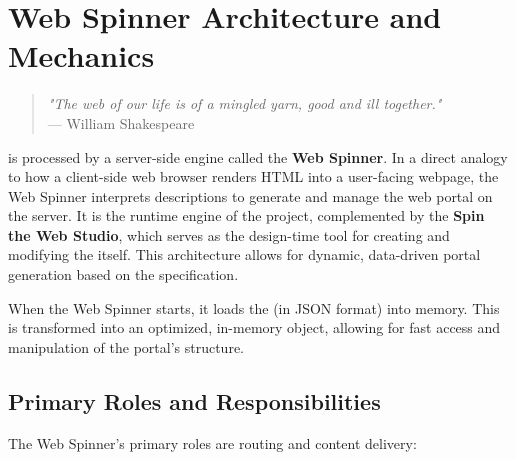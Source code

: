 
\chapter{Web Spinner Architecture and Mechanics}
\label{chap:web-spinner}

\begin{quote}
	\textit{"The web of our life is of a mingled yarn, good and ill together."} \\
— William Shakespeare
\end{quote}

\wbdl{} is processed by a server-side engine called the \textbf{Web Spinner}. In a direct analogy to how a client-side web browser renders HTML into a user-facing webpage, the Web Spinner interprets \wbdl{} descriptions to generate and manage the web portal on the server. It is the runtime engine of the project, complemented by the \textbf{Spin the Web Studio}, which serves as the design-time tool for creating and modifying the \webbase{} itself. This architecture allows for dynamic, data-driven portal generation based on the \wbdl{} specification.

When the Web Spinner starts, it loads the \webbase{} (in JSON format) into memory. This \webbase{} is transformed into an optimized, in-memory object, allowing for fast access and manipulation of the portal's structure.

\section{Primary Roles and Responsibilities}
\label{sec:primary-roles}

The Web Spinner's primary roles are routing and content delivery:

